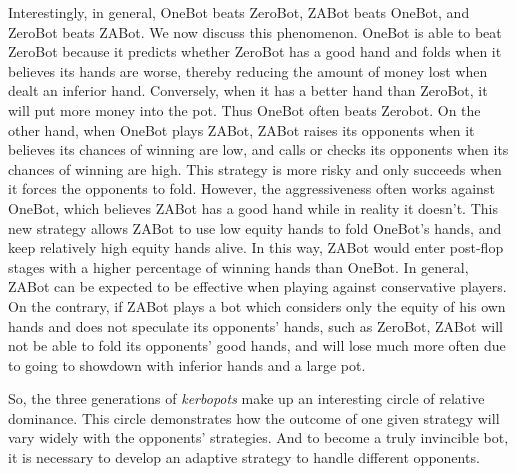 \documentclass[11pt, oneside]{article}   	%
\begin{document}
Interestingly, in general, OneBot beats ZeroBot, ZABot beats OneBot, and ZeroBot beats ZABot. We now discuss this phenomenon. OneBot is able to beat ZeroBot because it predicts whether ZeroBot has a good hand and folds when it believes its hands are worse, thereby reducing the amount of money lost when dealt an inferior hand. Conversely, when it has a better hand than ZeroBot, it will put more money into the pot. Thus OneBot often beats Zerobot. On the other hand, when OneBot plays ZABot, ZABot raises its opponents when it believes its chances of winning are low, and calls or checks its opponents when its chances of winning are high. This strategy is more risky and only succeeds when it forces the opponents to fold. However, the aggressiveness often works against OneBot, which believes ZABot has a good hand while in reality it doesn't. This new strategy allows ZABot to use low equity hands to fold OneBot's hands, and keep relatively high equity hands alive. In this way, ZABot would enter post-flop stages with a higher percentage of winning hands than OneBot. In general, ZABot can be expected to be effective when playing against conservative players. On the contrary, if ZABot plays a bot which considers only the equity of his own hands and does not speculate its opponents' hands, such as ZeroBot, ZABot will not be able to fold its opponents' good hands, and will lose much more often due to going to showdown with inferior hands and a large pot.

So, the three generations of \emph{kerbopots} make up an interesting circle of relative dominance. This circle demonstrates how the outcome of one given strategy will vary widely with the opponents' strategies. And to become a truly invincible bot, it is necessary to develop an adaptive strategy to handle different opponents.
\end{document}
